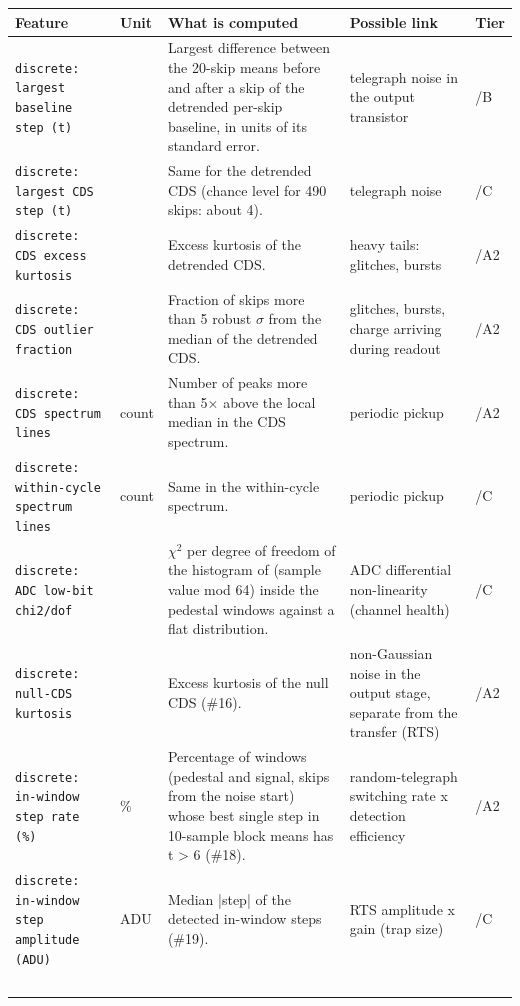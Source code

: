 \documentclass[10pt]{article}
\renewcommand{\_}{\oldunderscore\allowbreak}
\begin{document}
\begin{longtable}{>{\raggedright\arraybackslash}p{}>{\raggedright\arraybackslash}p{}>{\raggedright\arraybackslash}p{}>{\raggedright\arraybackslash}p{}>{\raggedright\arraybackslash}p{}}
\toprule Feature & Unit & What is computed & Possible link & Tier \\ \midrule \endhead
\bottomrule \endfoot
\texttt{discrete: largest baseline step (t)} &  & Largest difference between the 20-skip means before and after a skip of the detrended per-skip baseline, in units of its standard error. & telegraph noise in the output transistor & 0/B \\
\texttt{discrete: largest CDS step (t)} &  & Same for the detrended CDS (chance level for 490 skips: about 4). & telegraph noise & 0/C \\
\texttt{discrete: CDS excess kurtosis} &  & Excess kurtosis of the detrended CDS. & heavy tails: glitches, bursts & 0/A2 \\
\texttt{discrete: CDS outlier fraction} &  & Fraction of skips more than 5 robust $\sigma$ from the median of the detrended CDS. & glitches, bursts, charge arriving during readout & 0/A2 \\
\texttt{discrete: CDS spectrum lines} & count & Number of peaks more than 5$\times$ above the local median in the CDS spectrum. & periodic pickup & 0/A2 \\
\texttt{discrete: within-cycle spectrum lines} & count & Same in the within-cycle spectrum. & periodic pickup & 0/C \\
\texttt{discrete: ADC low-bit chi2/dof} &  & $\chi$$^{2}$ per degree of freedom of the histogram of (sample value mod 64) inside the pedestal windows against a flat distribution. & ADC differential non-linearity (channel health) & 0/C \\
\texttt{discrete: null-CDS kurtosis} &  & Excess kurtosis of the null CDS (\#16). & non-Gaussian noise in the output stage, separate from the transfer (RTS) & 1/A2 \\
\texttt{discrete: in-window step rate (\%)} & \% & Percentage of windows (pedestal and signal, skips from the noise start) whose best single step in 10-sample block means has t \textgreater{} 6 (\#18). & random-telegraph switching rate x detection efficiency & 1/A2 \\
\texttt{discrete: in-window step amplitude (ADU)} & ADU & Median |step| of the detected in-window steps (\#19). & RTS amplitude x gain (trap size) & 1/C \\
$$
\end{longtable}
\end{document}
